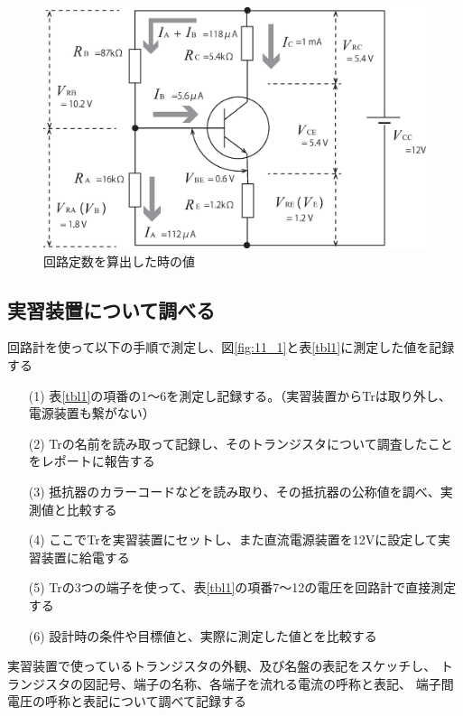 \documentclass[uplatex,a4paper,11pt,oneside,openany]{jsbook}
\begin{document}
\begin{figure}[H]
  \centering
   \includegraphics[keepaspectratio, scale=0.45, angle=0]
               {figs/eps/p96fig3a.eps}
               \caption{回路定数を算出した時の値}
               \label{fig:11_2}
\end{figure}

\subsection{実習装置について調べる}

回路計を使って以下の手順で測定し、図\ref{fig:11_1}と表\ref{tbl1}に測定した値を記録する

\begin{enumerate}
\item[(1)] 表\ref{tbl1}の項番の1〜6を測定し記録する。（実習装置からTrは取り外し、電源装置も繋がない）
\item[(2)] Trの名前を読み取って記録し、そのトランジスタについて調査したことをレポートに報告する
\item[(3)] 抵抗器のカラーコードなどを読み取り、その抵抗器の公称値を調べ、実測値と比較する
\item[(4)] ここでTrを実習装置にセットし、また直流電源装置を12Vに設定して実習装置に給電する
\item[(5)] Trの3つの端子を使って、表\ref{tbl1}の項番7〜12の電圧を回路計で直接測定する
\item[(6)] 設計時の条件や目標値と、実際に測定した値とを比較する
\end{enumerate}

実習装置で使っているトランジスタの外観、及び名盤の表記をスケッチし、
トランジスタの図記号、端子の名称、各端子を流れる電流の呼称と表記、
端子間電圧の呼称と表記について調べて記録する\\
\end{document}
